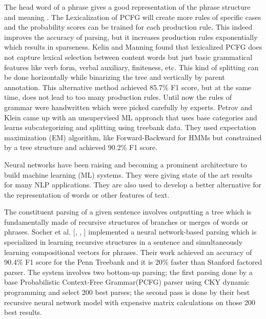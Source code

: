 \documentclass[a4paper, 11pt]{article}
\begin{document}
The head word of a phrase gives a good representation of the phrase structure and meaning \parencite{Charniak_1997}. The Lexicalization of PCFG \parencite{charniak2000} will create more rules of specific cases and the probability scores can be trained for each production rule. This indeed improves the accuracy of parsing, but it increases production rules exponentially which results in sparseness. Kelin and Manning \parencite{kleinunlexical} found that lexicalized PCFG does not capture lexical selection between content words but just basic grammatical features like verb form, verbal auxiliary, finiteness, etc. This kind of splitting can be done horizontally while binarizing the tree and vertically by parent annotation. This alternative method achieved 85.7\% F1 score, but at the same time, does not lead to too many production rules. Until now the rules of grammar were handwritten which were picked carefully by experts. Petrov and Klein \parencite{petrov2006} came up with an unsupervised ML approach that uses base categories and learns subcategorizing and splitting using treebank data. They used expectation maximization (EM) algorithm, like Forward-Backward for HMMs but constrained by a tree structure and achieved 90.2\% F1 score. 

Neural networks have been raising and becoming a prominent architecture to build machine learning (ML) systems. They were giving state of the art results for many NLP applications. They are also used to develop a better alternative for the representation of words or other features of text. 

The constituent parsing of a given sentence involves outputting a tree which is fundamentally made of recursive structures of branches or merges of words or phrases. Socher et al. [\parencite*{RichardSocher2011}, \parencite*{Socher}, \parencite*{Sochera}] implemented a neural network-based parsing which is specialized in learning recursive structures in a sentence and simultaneously learning compositional vectors for phrases. Their work achieved an accuracy of 90.4\% F1 score for the Penn Treebank and it is 20\% faster than Stanford factored parser. The system involves two bottom-up parsing; the first parsing done by a base Probabilistic Context-Free Grammar(PCFG) parser using CKY dynamic programming and select 200 best parses; the second pass is done by their best recursive neural network model with expensive matrix calculations on those 200 best results. 

\end{document}
